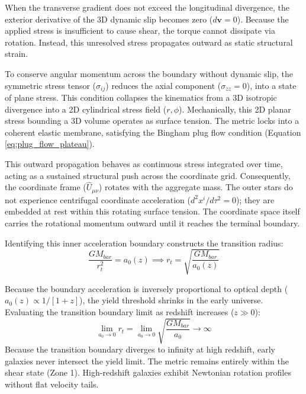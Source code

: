 When the transverse gradient does not exceed the longitudinal divergence, the exterior derivative of the 3D dynamic slip becomes zero ($d\mathbf{v} = 0$). Because the applied stress is insufficient to cause shear, the torque cannot dissipate via rotation. Instead, this unresolved stress propagates outward as static structural strain. 

To conserve angular momentum across the boundary without dynamic slip, the symmetric stress tensor ($\sigma_{ij}$) reduces the axial component ($\sigma_{zz} = 0$), into a state of plane stress. This condition collapses the kinematics from a 3D isotropic divergence into a 2D cylindrical stress field ($r, \phi$). Mechanically, this 2D planar stress bounding a 3D volume operates as surface tension. The metric locks into a coherent elastic membrane, satisfying the Bingham plug flow condition (Equation \ref{eq:plug_flow_plateau}). 

This outward propagation behaves as continuous stress integrated over time, acting as a sustained structural push across the coordinate grid. Consequently, the coordinate frame ($\hat{U}_{\mu\nu}$) rotates with the aggregate mass. The outer stars do not experience centrifugal coordinate acceleration ($d^2x^i/d\tau^2 = 0$); they are embedded at rest within this rotating surface tension. The coordinate space itself carries the rotational momentum outward until it reaches the terminal boundary. 

Identifying this inner acceleration boundary constructs the transition radius: 
\begin{equation}
    \frac{G M_{bar}}{r_t^2} = a_0(z) \implies r_t = \sqrt{\frac{G M_{bar}}{a_0(z)}}
\end{equation}

Because the boundary acceleration is inversely proportional to optical depth ($a_0(z) \propto 1/[1+z]$), the yield threshold shrinks in the early universe. Evaluating the transition boundary limit as redshift increases ($z \gg 0$):
\begin{equation}
    \lim_{a_0 \to 0} r_t = \lim_{a_0 \to 0} \sqrt{\frac{G M_{bar}}{a_0}} \to \infty
\end{equation}
Because the transition boundary diverges to infinity at high redshift, early galaxies never intersect the yield limit. The metric remains entirely within the shear state (Zone 1). High-redshift galaxies exhibit Newtonian rotation profiles without flat velocity tails. 

